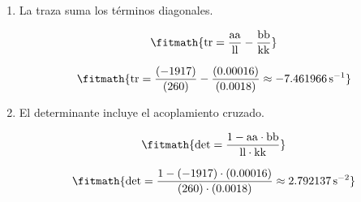 \begin{enumerate}

\item La traza suma los términos diagonales.

\[\fitmath{\mathrm{tr}=\frac{\mathrm{aa}}{\mathrm{ll}}-\frac{\mathrm{bb}}{\mathrm{kk}}}\]

\[\fitmath{\mathrm{tr}=\frac{(-1917)}{(260)}-\frac{(0.00016)}{(0.0018)}\approx -7.461966\,\mathrm{s^{-1}}}\]

\item El determinante incluye el acoplamiento cruzado.

\[\fitmath{\mathrm{det}=\frac{1-\mathrm{aa}\cdot \mathrm{bb}}{\mathrm{ll}\cdot \mathrm{kk}}}\]

\[\fitmath{\mathrm{det}=\frac{1-(-1917)\cdot (0.00016)}{(260)\cdot (0.0018)}\approx 2.792137\,\mathrm{s^{-2}}}\]

\end{enumerate}
